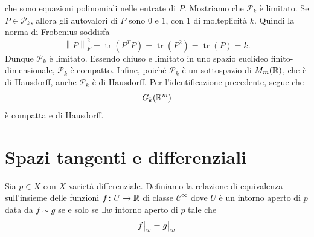 \documentclass[a4paper]{article}
\begin{document}
\begin{snippetproof}{}
\[    \]
    che sono equazioni polinomiali nelle entrate di \(P\).
    Mostriamo che \(\mathcal{P}_k\) è limitato. Se \(P\in\mathcal{P}_k\), allora gli autovalori di \(P\) sono \(0\) e \(1\), con \(1\) di molteplicità \(k\). Quindi la norma di Frobenius soddisfa
    \[
        \left\|P\right\|_F^2
        =
        \operatorname{tr}(P^TP)
        =
        \operatorname{tr}(P^2)
        =
        \operatorname{tr}(P)
        =
        k.
    \]
    Dunque \(\mathcal{P}_k\) è limitato. Essendo chiuso e limitato in uno spazio euclideo finito-dimensionale, \(\mathcal{P}_k\) è compatto.
    Infine, poiché \(\mathcal{P}_k\) è un sottospazio di \(M_m(\mathbb{R})\), che è di Hausdorff, anche \(\mathcal{P}_k\) è di Hausdorff. Per l'identificazione precedente, segue che
    \[
        G_k(\mathbb{R}^m)
    \]
    è compatta e di Hausdorff.
\end{snippetproof}

\section{Spazi tangenti e differenziali}

\begin{snippetdefinition}{}
    Sia \(p \in X\) con \(X\) varietà differenziale.
    Definiamo la relazione di equivalenza sull'insieme
    delle funzioni
    \(f \colon U \to \mathbb{R}\)
    di classe \(\mathcal C^\infty\)
    dove \(U\) è un intorno aperto di \(p\)
    data da \(f \sim g\) se e solo se
    \(\exists w\) intorno aperto di \(p\) tale che
    \[
        \restr{f}{w} = \restr{g}{w}
    \]
\end{snippetdefinition}

\begin{center}
\end{center}
\end{document}
